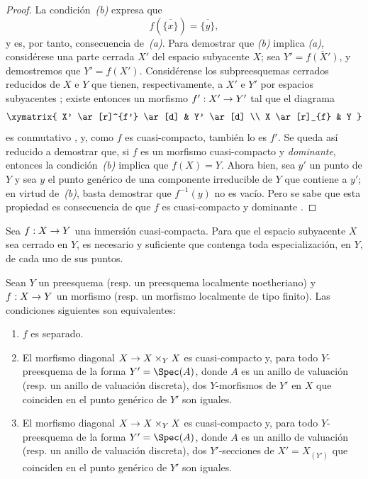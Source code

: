 \documentclass[oneside,10pt]{amsart}
\makeatletter
\newcommand{\ega@arrow}[2]{\mathchoice{#1}{#2}{#2}{#2}}
\renewcommand{\to}{\ega@arrow{\longrightarrow}{\rightarrow}}
\newcommand{\oldpage}[2][]{\marginnote{\normalfont\footnotesize\textbf{#1}~|~#2}\ignorespaces}
\let\EGAOriginalLabel\label
\renewcommand{\label}[1]{\phantomsection\EGAOriginalLabel{#1}}
\makeatother
\begin{document}
\begin{proof}
La condición~\emph{(b)} expresa que
\[
  f(\overline{\{x\}})=\overline{\{y\}},
\]
y es, por tanto, consecuencia de~\emph{(a)}.
Para demostrar que \emph{(b)} implica \emph{(a)}, considérese una parte cerrada $X'$ del espacio subyacente $X$;
sea $Y'=\overline{f(X')}$, y demostremos que $Y'=f(X')$.
Considérense los subpreesquemas cerrados reducidos de $X$ e $Y$ que tienen, respectivamente, a $X'$ e $Y'$ por espacios subyacentes ;
existe entonces un morfismo $f':X'\to Y'$ tal que el diagrama
\[
  \xymatrix{
      X' \ar[r]^{f'} \ar[d]
      & Y' \ar[d]
  \\  X \ar[r]_{f}
      & Y
  }
\]
es conmutativo , y, como $f$ es cuasi-compacto, también lo es $f'$.
Se queda así reducido a demostrar que, si $f$ es un morfismo cuasi-compacto y \emph{dominante}, entonces
\oldpage[II]{142}
la condición~\emph{(b)} implica que $f(X)=Y$.
Ahora bien, sea $y'$ un punto de $Y$ y sea $y$ el punto genérico de una componente irreducible de $Y$ que contiene a $y'$;
en virtud de~\emph{(b)}, basta demostrar que $f^{-1}(y)$ no es vacío.
Pero se sabe que esta propiedad es consecuencia de que $f$ es cuasi-compacto y dominante .
\end{proof}

\begin{corollary}[7.2.2]
\label{II.7.2.2}
Sea $f:X\to Y$ una inmersión cuasi-compacta.
Para que el espacio subyacente $X$ sea cerrado en $Y$, es necesario y suficiente que contenga toda especialización, en $Y$, de cada uno de sus puntos.
\end{corollary}


\begin{proposition}[7.2.3]
\label{II.7.2.3}
Sean $Y$ un preesquema \textup{(resp.} un preesquema localmente noetheriano\textup{)} y $f:X\to Y$ un morfismo \textup{(resp.} un morfismo localmente de tipo finito\textup{)}.
Las condiciones siguientes son equivalentes:
\begin{enumerate}
  \item[\rm{(a)}] $f$ es separado.
  \item[\rm{(b)}] El morfismo diagonal $X\to X\times_Y X$ es cuasi-compacto y, para todo $Y$-preesquema de la forma $Y'=\Spec(A)$, donde $A$ es un anillo de valuación \textup{(resp.} un anillo de valuación discreta\textup{)}, dos $Y$-morfismos de $Y'$ en $X$ que coinciden en el punto genérico de $Y'$ son iguales.
  \item[\rm{(c)}] El morfismo diagonal $X\to X\times_Y X$ es cuasi-compacto y, para todo $Y$-preesquema de la forma $Y'=\Spec(A)$, donde $A$ es un anillo de valuación \textup{(resp.} un anillo de valuación discreta\textup{)}, dos $Y'$-secciones de $X'=X_{(Y')}$ que coinciden en el punto genérico de $Y'$ son iguales.
\end{enumerate}
\end{proposition}
\end{document}
